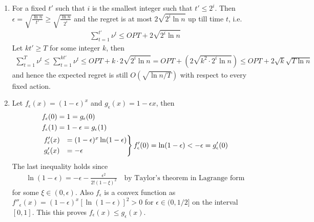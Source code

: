 \documentclass[a4paper,12pt]{article}
\theoremstyle{definition}
\begin{document}
\begin{enumerate}
\item For a fixed $t'$ such that $i$ is the smallest integer such that $t'\leq2^i$. Then $\epsilon=\sqrt{\frac{\ln n}{t'}}\geq\sqrt{\frac{\ln n}{2^i}}$ and the regret is at most $2\sqrt{2^i\ln n}$ up till time $t$, i.e.
\begin{align*}
\sum_{t=1}^{t'}\nu^t \leq OPT + 2\sqrt{2^i\ln n}
\end{align*}
Let $kt'\geq T$ for some integer $k$, then
\begin{align*}
\sum_{t=1}^{T}\nu^t \leq\sum_{t=1}^{kt'}\nu^t \leq OPT + k\cdot 2\sqrt{2^i\ln n}=OPT + (2\sqrt{k^2\cdot 2^i\ln n}) \leq OPT + 2\sqrt{k}\sqrt{T\ln n}
\end{align*}
and hence the expected regret is still $O(\sqrt{\ln n/T})$ with respect to every fixed action.
\item \label{eq:q4} Let $f_\epsilon(x)=(1-\epsilon)^x$ and $g_\epsilon(x)=1-\epsilon x$, then \label{eq:q4}
\begin{align*}
&f_\epsilon(0) = 1 = g_\epsilon(0)\\
&f_\epsilon(1) = 1-\epsilon = g_\epsilon(1)\\
&\begin{rcases}
 f'_\epsilon(x)&=(1-\epsilon)^x\ln (1-\epsilon) \\
  g'_\epsilon(x)&=-\epsilon \\
\end{rcases}f'_\epsilon(0) = \ln(1-\epsilon) < -\epsilon= g'_\epsilon(0)
\end{align*}
The last inequality holds since
\begin{align*}
\ln(1-\epsilon)=-\epsilon -\frac{\epsilon^2}{2!(1-\xi)^2}\quad \text{by Taylor's theorem in Lagrange form}
\end{align*}
for some $\xi \in (0,\epsilon)$. Also $f_\epsilon$ is a convex function as $f''_\epsilon(x)=(1-\epsilon)^x\left[\ln (1-\epsilon)\right]^2>0$ for $\epsilon \in(0,1/2]$ on the interval $[0,1]$. This this proves $f_\epsilon(x)\leq g_\epsilon(x)$.


\end{enumerate}
\end{document}
